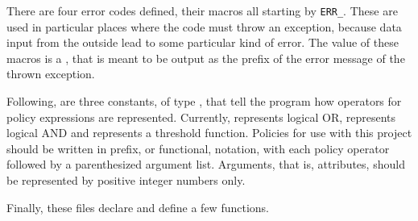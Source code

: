 \documentclass{article}
\begin{document}
There are four error codes defined, their macros all starting by \verb|ERR_|. These are used in particular places where the code must throw an exception, because data input from the outside lead to some particular kind of error. The value of these macros is a , that is meant to be output as the prefix of the error message of the thrown exception.

Following, are three constants, of type , that tell the program how operators for policy expressions are represented. Currently,  represents logical OR,  represents logical AND and  represents a threshold function. Policies for use with this project should be written in prefix, or functional, notation, with each policy operator followed by a parenthesized argument list. Arguments, that is, attributes, should be represented by positive integer numbers only.

Finally, these files declare and define a few functions. 
\end{document}
